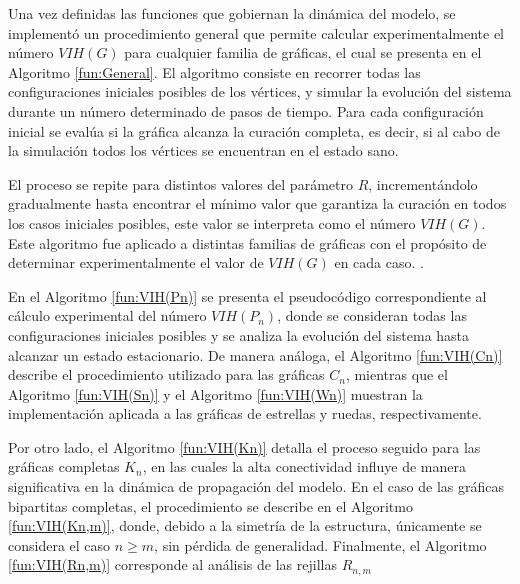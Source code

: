 \documentclass[12pt,titlepage,twoside,openright]{book}
\begin{document}
Una vez definidas las funciones que gobiernan la din\'amica del modelo, se implement\'o un procedimiento general que permite calcular experimentalmente el n\'umero $VIH(G)$ para cualquier familia de gr\'aficas, el cual se presenta en el Algoritmo \ref{fun:General}. El algoritmo consiste en recorrer todas las configuraciones iniciales posibles de los v\'ertices, y simular la evoluci\'on del sistema durante un n\'umero determinado de pasos de tiempo. Para cada configuraci\'on inicial se eval\'ua si la gr\'afica alcanza la curaci\'on completa, es decir, si al cabo de la simulaci\'on todos los v\'ertices se encuentran en el estado sano.

El proceso se repite para distintos valores del par\'ametro $R$, increment\'andolo gradualmente hasta encontrar el m\'inimo valor que garantiza la curaci\'on en todos los casos iniciales posibles, este valor se interpreta como el n\'umero $VIH(G)$. Este algoritmo fue aplicado a distintas familias de gr\'aficas con el prop\'osito de determinar experimentalmente el valor de $VIH(G)$ en cada caso. .

En el Algoritmo \ref{fun:VIH(Pn)} se presenta el pseudoc\'odigo correspondiente al c\'alculo experimental del n\'umero $VIH(P_n)$, donde se consideran todas las configuraciones iniciales posibles y se analiza la evoluci\'on del sistema hasta alcanzar un estado estacionario. De manera an\'aloga, el Algoritmo \ref{fun:VIH(Cn)} describe el procedimiento utilizado para las gr\'aficas $C_n$, mientras que el Algoritmo \ref{fun:VIH(Sn)} y el Algoritmo \ref{fun:VIH(Wn)} muestran la implementaci\'on aplicada a las gr\'aficas de estrellas y ruedas, respectivamente.

Por otro lado, el Algoritmo \ref{fun:VIH(Kn)} detalla el proceso seguido para las gr\'aficas completas $K_n$, en las cuales la alta conectividad influye de manera significativa en la din\'amica de propagaci\'on del modelo. En el caso de las gr\'aficas bipartitas completas, el procedimiento se describe en el Algoritmo \ref{fun:VIH(Kn,m)}, donde, debido a la simetr\'ia de la estructura, \'unicamente se considera el caso $n \geq m$, sin p\'erdida de generalidad. Finalmente, el Algoritmo \ref{fun:VIH(Rn,m)} corresponde al an\'alisis de las rejillas $R_{n,m}$
\end{document}
